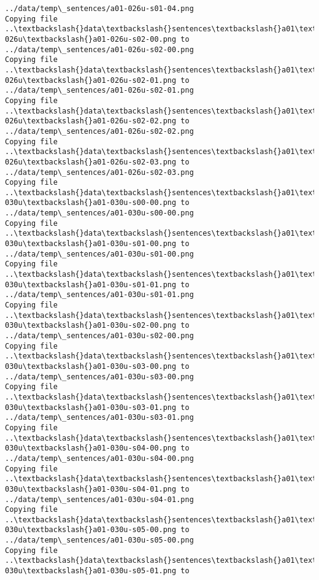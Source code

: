 \documentclass[11pt]{article}
\begin{document}
\begin{Verbatim}[commandchars=\\\{\}]
../data/temp\_sentences/a01-026u-s01-04.png
Copying file ..\textbackslash{}data\textbackslash{}sentences\textbackslash{}a01\textbackslash{}a01-026u\textbackslash{}a01-026u-s02-00.png to
../data/temp\_sentences/a01-026u-s02-00.png
Copying file ..\textbackslash{}data\textbackslash{}sentences\textbackslash{}a01\textbackslash{}a01-026u\textbackslash{}a01-026u-s02-01.png to
../data/temp\_sentences/a01-026u-s02-01.png
Copying file ..\textbackslash{}data\textbackslash{}sentences\textbackslash{}a01\textbackslash{}a01-026u\textbackslash{}a01-026u-s02-02.png to
../data/temp\_sentences/a01-026u-s02-02.png
Copying file ..\textbackslash{}data\textbackslash{}sentences\textbackslash{}a01\textbackslash{}a01-026u\textbackslash{}a01-026u-s02-03.png to
../data/temp\_sentences/a01-026u-s02-03.png
Copying file ..\textbackslash{}data\textbackslash{}sentences\textbackslash{}a01\textbackslash{}a01-030u\textbackslash{}a01-030u-s00-00.png to
../data/temp\_sentences/a01-030u-s00-00.png
Copying file ..\textbackslash{}data\textbackslash{}sentences\textbackslash{}a01\textbackslash{}a01-030u\textbackslash{}a01-030u-s01-00.png to
../data/temp\_sentences/a01-030u-s01-00.png
Copying file ..\textbackslash{}data\textbackslash{}sentences\textbackslash{}a01\textbackslash{}a01-030u\textbackslash{}a01-030u-s01-01.png to
../data/temp\_sentences/a01-030u-s01-01.png
Copying file ..\textbackslash{}data\textbackslash{}sentences\textbackslash{}a01\textbackslash{}a01-030u\textbackslash{}a01-030u-s02-00.png to
../data/temp\_sentences/a01-030u-s02-00.png
Copying file ..\textbackslash{}data\textbackslash{}sentences\textbackslash{}a01\textbackslash{}a01-030u\textbackslash{}a01-030u-s03-00.png to
../data/temp\_sentences/a01-030u-s03-00.png
Copying file ..\textbackslash{}data\textbackslash{}sentences\textbackslash{}a01\textbackslash{}a01-030u\textbackslash{}a01-030u-s03-01.png to
../data/temp\_sentences/a01-030u-s03-01.png
Copying file ..\textbackslash{}data\textbackslash{}sentences\textbackslash{}a01\textbackslash{}a01-030u\textbackslash{}a01-030u-s04-00.png to
../data/temp\_sentences/a01-030u-s04-00.png
Copying file ..\textbackslash{}data\textbackslash{}sentences\textbackslash{}a01\textbackslash{}a01-030u\textbackslash{}a01-030u-s04-01.png to
../data/temp\_sentences/a01-030u-s04-01.png
Copying file ..\textbackslash{}data\textbackslash{}sentences\textbackslash{}a01\textbackslash{}a01-030u\textbackslash{}a01-030u-s05-00.png to
../data/temp\_sentences/a01-030u-s05-00.png
Copying file ..\textbackslash{}data\textbackslash{}sentences\textbackslash{}a01\textbackslash{}a01-030u\textbackslash{}a01-030u-s05-01.png to

\end{Verbatim}
\end{document}
